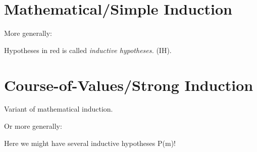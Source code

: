\section{Mathematical/Simple Induction} %
\label{sec:mathematical_simple_induction}
\begin{prooftree}
\end{prooftree}
More generally:
\begin{prooftree}
\end{prooftree}
Hypotheses in red is called {\color{red} \emph{inductive hypotheses.}} (IH).

\section{Course-of-Values/Strong Induction} %
\label{sec:course_of_values_strong_induction}
Variant of mathematical induction.
\begin{prooftree}
\end{prooftree}
Or more generally:
\begin{prooftree}
\end{prooftree}
Here we might have {\color{red} several inductive hypotheses} P(m)!

